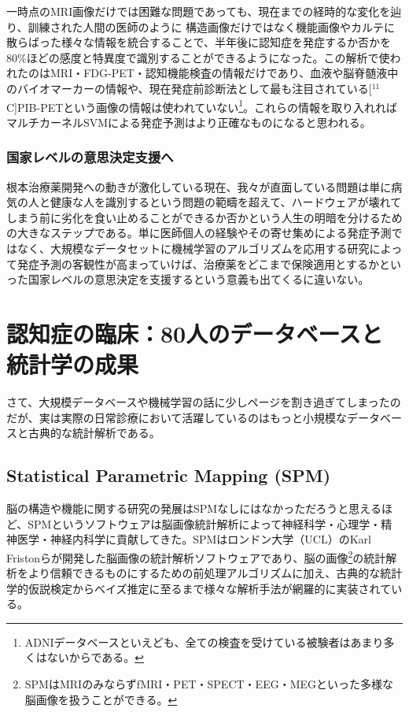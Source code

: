一時点のMRI画像だけでは困難な問題であっても、現在までの経時的な変化を辿り、訓練された人間の医師のように
構造画像だけではなく機能画像やカルテに散らばった様々な情報を統合することで、半年後に認知症を発症するか否かを80\%ほどの感度と特異度で識別することができるようになった。この解析で使われたのはMRI・FDG-PET・認知機能検査の情報だけであり、血液や脳脊髄液中のバイオマーカーの情報や、現在発症前診断法として最も注目されている[$^{11}$C]PIB-PETという画像の情報は使われていない\footnote{ADNIデータベースといえども、全ての検査を受けている被験者はあまり多くはないからである。}。これらの情報を取り入れればマルチカーネルSVMによる発症予測はより正確なものになると思われる。

\subsubsection{国家レベルの意思決定支援へ}
根本治療薬開発への動きが激化している現在、我々が直面している問題は単に病気の人と健康な人を識別するという問題の範疇を超えて、ハードウェアが壊れてしまう前に劣化を食い止めることができるか否かという人生の明暗を分けるための大きなステップである。単に医師個人の経験やその寄せ集めによる発症予測ではなく、大規模なデータセットに機械学習のアルゴリズムを応用する研究によって発症予測の客観性が高まっていけば、治療薬をどこまで保険適用とするかといった国家レベルの意思決定を支援するという意義も出てくるに違いない。


\section{認知症の臨床：80人のデータベースと統計学の成果}
さて、大規模データベースや機械学習の話に少しページを割き過ぎてしまったのだが、実は実際の日常診療において活躍しているのはもっと小規模なデータベースと古典的な統計解析である。

\subsection{Statistical Parametric Mapping (SPM)}
脳の構造や機能に関する研究の発展はSPMなしにはなかっただろうと思えるほど、SPMというソフトウェアは脳画像統計解析によって神経科学・心理学・精神医学・神経内科学に貢献してきた。SPMはロンドン大学（UCL）のKarl Fristonらが開発した脳画像の統計解析ソフトウェアであり、脳の画像\footnote{SPMはMRIのみならずfMRI・PET・SPECT・EEG・MEGといった多様な脳画像を扱うことができる。}の統計解析をより信頼できるものにするための前処理アルゴリズムに加え、古典的な統計学的仮説検定からベイズ推定に至るまで様々な解析手法が網羅的に実装されている。

